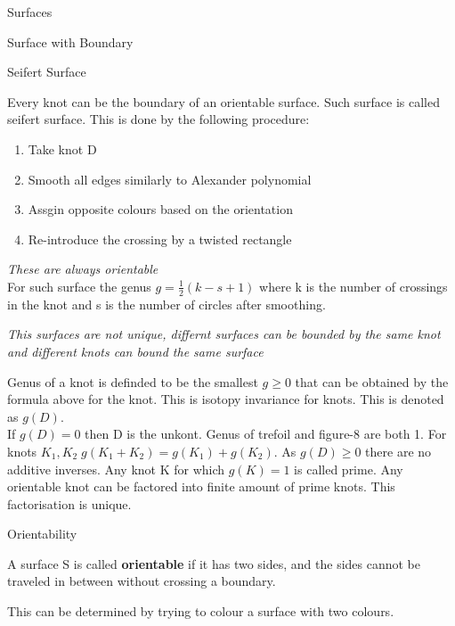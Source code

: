 \documentclass[12pt, letterpaper]{article}
\begin{document}
\begin{section}{Surfaces}
\begin{subsection}{Surface with Boundary}
  \end{subsection}

  \begin{subsection}{Seifert Surface}

    Every knot can be the boundary of an orientable surface. Such surface is
    called seifert surface.
    This is done by the following procedure:
    \begin{enumerate}
      \item Take knot D
      \item Smooth all edges similarly to Alexander polynomial
      \item Assgin opposite colours based on the orientation
      \item Re-introduce the crossing by a twisted rectangle
    \end{enumerate}

    \emph{These are always orientable} \\
    For such surface the genus \(g = \frac{1}{2} (k - s  + 1)\) where k is the
    number of crossings in the knot and s is the number of circles after smoothing.

    \emph{This surfaces are not unique, differnt surfaces can be bounded by the
      same knot and different knots can bound the same surface}


    Genus of a knot is definded to be the smallest \(g \geq 0\) that can be
    obtained by the formula above for the knot. This is isotopy invariance for
    knots. This is denoted as \(g(D)\). \\
    If \(g(D) = 0\) then D is the unkont. Genus of trefoil and figure-8 are both 1.
    For knots \(K_{1}, K_{2} \; g(K_{1} + K_{2}) = g(K_{1}) + g(K_{2})\). As
    \(g(D) \geq 0\) there are no additive inverses. Any knot K for which \(g(K) = 1\)
    is called prime. Any orientable knot can be factored into finite amount of prime
    knots. This factorisation is unique.

  \end{subsection}

  \begin{subsection}{Orientability}

    A surface S is called \textbf{orientable} if it has two sides, and
    the sides cannot be traveled in between without crossing a boundary.

    This can be determined by trying to colour a surface with two colours.

  \end{subsection}


\end{section}
\end{document}
